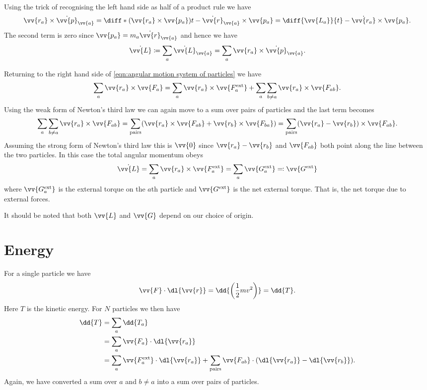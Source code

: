 \documentclass[fleqn]{NotesClass}
\newcommand*{\ext}{\mathrm{ext}}
\begin{document}
    Using the trick of recognising the left hand side as half of a product rule we have
    \begin{equation}
        \vv{r_a}\times\dot{\vv{p}}_{\vv{a}} = \diff*{(\vv{r_a}\times\vv{p_a})}{t} - \dot{\vv{r}}_{\vv{a}}\times\vv{p_a} = \diff{\vv{L_a}}{t} - \dot{\vv{r_a}} \times \vv{p_a}.
    \end{equation}
    The second term is zero since \(\vv{p_a} = m_a\dot{\vv{r}}_{\vv{a}}\) and hence we have
    \begin{equation}
        \dot{\vv{L}} \coloneqq \sum_a \dot{\vv{L}}_{\vv{a}} = \sum_a \vv{r_a}\times\dot{\vv{p}}_{\vv{a}}.
    \end{equation}
    
    Returning to the right hand side of \cref{eqn:angular motion system of particles} we have
    \begin{equation}
        \sum_a \vv{r_a}\times\vv{F_a} = \sum_a \vv{r_a} \times \vv{F_a^{\ext}} + \sum_{a}\sum_{b\ne a}\vv{r_a}\times\vv{F_{ab}}.
    \end{equation}
    Using the weak form of Newton's third law we can again move to a sum over pairs of particles and the last term becomes
    \begin{equation}
        \sum_{a}\sum_{b\ne a} \vv{r_a}\times \vv{F_{ab}} = \sum_{\text{pairs}} (\vv{r_a}\times \vv{F_{ab}} + \vv{r_b}\times\vv{F_{ba}}) = \sum_{\text{pairs}} (\vv{r_a} - \vv{r_b})\times\vv{F_{ab}}.
    \end{equation}
    Assuming the strong form of Newton's third law this is \(\vv{0}\) since \(\vv{r_a} - \vv{r_b}\) and \(\vv{F_{ab}}\) both point along the line between the two particles.
    In this case the total angular momentum obeys
    \begin{equation}
        \dot{\vv{L}} = \sum_a \vv{r_a}\times\vv{F_a^{\ext}} = \sum_a \vv{G_a^{\ext}} \eqqcolon \vv{G^{\ext}}
    \end{equation}
    where \(\vv{G_a^{\ext}}\) is the external torque on the \(a\)th particle and \(\vv{G^{\ext}}\) is the net external torque.
    That is, the net torque due to external forces.
    
    It should be noted that both \(\vv{L}\) and \(\vv{G}\) depend on our choice of origin.
    
    \section{Energy}
    For a single particle we have
    \begin{equation}
        \vv{F}\cdot\dl{\vv{r}} = \dd{\left( \frac{1}{2}mv^2 \right)} = \dd{T}.
    \end{equation}
    Here \(T\) is the kinetic energy.
    For \(N\) particles we then have
    \begin{align}
        \dd{T} &= \sum_a \dd{T_a}\\
        &= \sum_a \vv{F_a}\cdot\dl{\vv{r_a}}\\
        &= \sum_a \vv{F_a^{\ext}}\cdot\dl{\vv{r_a}} + \sum_{\text{pairs}} \vv{F_{ab}}\cdot(\dl{\vv{r_a}} - \dl{\vv{r_b}}).
    \end{align}
    Again, we have converted a sum over \(a\) and \(b \ne a\) into a sum over pairs of particles.
    
\end{document}
